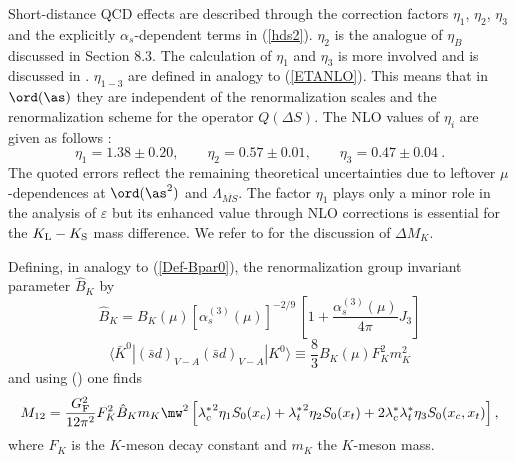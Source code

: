 Short-distance QCD effects are described through the correction
factors $\eta_1$, $\eta_2$, $\eta_3$ and the explicitly
$\alpha_s$-dependent terms in (\ref{hds2}). 
$\eta_2$ is the analogue of $\eta_B$ discussed in Section 8.3.
The calculation of $\eta_1$ and $\eta_3$ is more involved and
is discussed in \cite{HNa,HNb}.
$\eta_{1-3}$ are defined in analogy to (\ref{ETANLO}). This means that
in $\ord(\as)$ they are independent of the renormalization
scales and the renormalization scheme for the operator $Q(\Delta S)$.
The NLO values of $\eta_i$ are given as follows \cite{HNa,BJW90,HNb}:
\begin{equation}
\eta_1=1.38\pm 0.20,\qquad
\eta_2=0.57\pm 0.01,\qquad
  \eta_3=0.47\pm0.04~.
\end{equation}
The quoted errors reflect the remaining theoretical uncertainties due to
leftover $\mu$-dependences at $\ord(\as^2)$ and $\Lambda_{\overline{MS}}$.
The factor $\eta_1$ plays only a minor role in the analysis of
$\varepsilon$ but its enhanced value through NLO corrections 
is essential for the $K_{\rm L}-K_{\rm S}$ mass difference.
We refer to \cite{HNa} for the discussion of $\Delta M_K$.

Defining, in analogy to (\ref{Def-Bpar0}),  the renormalization group 
invariant parameter $\hat B_K$ by
\begin{equation}
\hat B_K = B_K(\mu) \left[ \alpha_s^{(3)}(\mu) \right]^{-2/9} \,
\left[ 1 + \frac{\alpha_s^{(3)}(\mu)}{4\pi} J_3 \right]
\label{eq:BKrenorm}
\end{equation}
\begin{equation}
\langle \bar K^0| (\bar s d)_{V-A} (\bar s d)_{V-A} |K^0\rangle
\equiv \frac{8}{3} B_K(\mu) F_K^2 m_K^2
\label{eq:KbarK}
\end{equation}
and using () one finds
\begin{equation}
M_{12} = \frac{G_{\rm F}^2}{12 \pi^2} F_K^2 \hat B_K m_K \mw^2
\left[ {\lambda_c^*}^2 \eta_1 S_0(x_c) + {\lambda_t^*}^2 \eta_2 S_0(x_t) +
2 {\lambda_c^*} {\lambda_t^*} \eta_3 S_0(x_c, x_t) \right],
\label{eq:M12K}
\end{equation}
where $F_K$ is the $K$-meson decay constant and $m_K$
the $K$-meson mass. 

